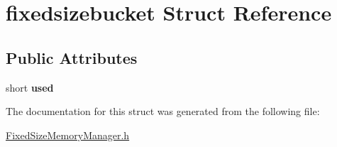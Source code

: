 \hypertarget{structfixedsizebucket}{
\section{fixedsizebucket Struct Reference}
\label{structfixedsizebucket}
}
\subsection*{Public Attributes}
\begin{DoxyCompactItemize}
\item 
\hypertarget{structfixedsizebucket_a375e4654487785c14aa596db5952401d}{
short {\bfseries used}}
\label{structfixedsizebucket_a375e4654487785c14aa596db5952401d}

\end{DoxyCompactItemize}


The documentation for this struct was generated from the following file:\begin{DoxyCompactItemize}
\item 
\hyperlink{FixedSizeMemoryManager_8h}{FixedSizeMemoryManager.h}\end{DoxyCompactItemize}
